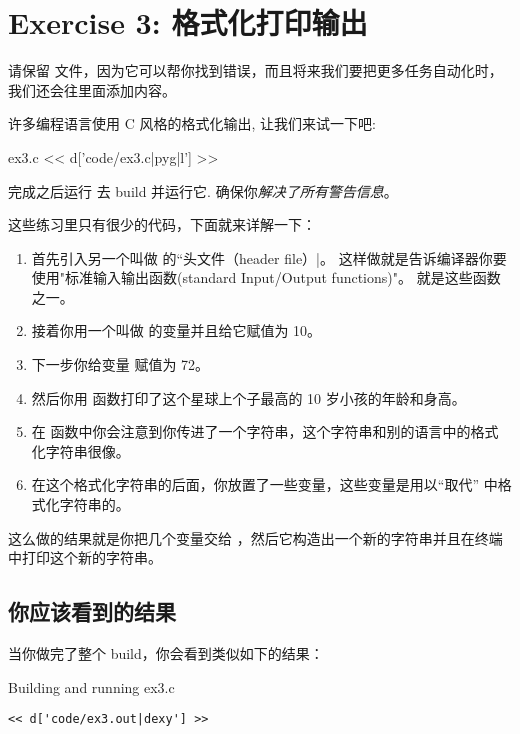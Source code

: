 \chapter{Exercise 3: 格式化打印输出}

请保留   文件，因为它可以帮你找到错误，而且将来我们要把更多任务自动化时，我们还会往里面添加内容。

许多编程语言使用 C 风格的格式化输出, 让我们来试一下吧:

\begin{code}{ex3.c}
<< d['code/ex3.c|pyg|l'] >>
\end{code}

完成之后运行  去 build 并运行它. 
确保你\emph{解决了所有警告信息}。

这些练习里只有很少的代码，下面就来详解一下：

\begin{enumerate}
\item 首先引入另一个叫做  的“头文件（header file）|。 这样做就是告诉编译器你要使用"标准输入输出函数(standard Input/Output functions)"。 就是这些函数之一。
\item 接着你用一个叫做  的变量并且给它赋值为 10。
\item 下一步你给变量  赋值为 72。
\item 然后你用  函数打印了这个星球上个子最高的 10  岁小孩的年龄和身高。
\item 在  函数中你会注意到你传进了一个字符串，这个字符串和别的语言中的格式化字符串很像。
\item 在这个格式化字符串的后面，你放置了一些变量，这些变量是用以“取代”  中格式化字符串的。
\end{enumerate}

这么做的结果就是你把几个变量交给 ，然后它构造出一个新的字符串并且在终端中打印这个新的字符串。

\section{你应该看到的结果}

当你做完了整个 build，你会看到类似如下的结果：

\begin{Terminal}{Building and running ex3.c}
\begin{lstlisting}
<< d['code/ex3.out|dexy'] >>
\end{lstlisting}
\end{Terminal}

